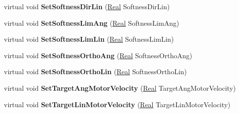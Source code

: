 \begin{DoxyCompactItemize}
\item 
\hypertarget{classphys_1_1SliderConstraint_a3a1c5c42c6f74325f2a2b4b9848903fe}{
virtual void {\bfseries SetSoftnessDirLin} (\hyperlink{namespacephys_af7eb897198d265b8e868f45240230d5f}{Real} SoftnessDirLin)}
\label{classphys_1_1SliderConstraint_a3a1c5c42c6f74325f2a2b4b9848903fe}

\item 
\hypertarget{classphys_1_1SliderConstraint_a8b098fda35892a8e9ae1cca00c1d9a44}{
virtual void {\bfseries SetSoftnessLimAng} (\hyperlink{namespacephys_af7eb897198d265b8e868f45240230d5f}{Real} SoftnessLimAng)}
\label{classphys_1_1SliderConstraint_a8b098fda35892a8e9ae1cca00c1d9a44}

\item 
\hypertarget{classphys_1_1SliderConstraint_a4ecd03e28d90b4dd75059e766df53bc7}{
virtual void {\bfseries SetSoftnessLimLin} (\hyperlink{namespacephys_af7eb897198d265b8e868f45240230d5f}{Real} SoftnessLimLin)}
\label{classphys_1_1SliderConstraint_a4ecd03e28d90b4dd75059e766df53bc7}

\item 
\hypertarget{classphys_1_1SliderConstraint_a4840ed43bbe8b99fb9c33a3da2c97548}{
virtual void {\bfseries SetSoftnessOrthoAng} (\hyperlink{namespacephys_af7eb897198d265b8e868f45240230d5f}{Real} SoftnessOrthoAng)}
\label{classphys_1_1SliderConstraint_a4840ed43bbe8b99fb9c33a3da2c97548}

\item 
\hypertarget{classphys_1_1SliderConstraint_a9821ecd0d7e2dbef81fdb41e5bdfd35a}{
virtual void {\bfseries SetSoftnessOrthoLin} (\hyperlink{namespacephys_af7eb897198d265b8e868f45240230d5f}{Real} SoftnessOrthoLin)}
\label{classphys_1_1SliderConstraint_a9821ecd0d7e2dbef81fdb41e5bdfd35a}

\item 
\hypertarget{classphys_1_1SliderConstraint_a69efafef3a61ae10836e877e71e2d84c}{
virtual void {\bfseries SetTargetAngMotorVelocity} (\hyperlink{namespacephys_af7eb897198d265b8e868f45240230d5f}{Real} TargetAngMotorVelocity)}
\label{classphys_1_1SliderConstraint_a69efafef3a61ae10836e877e71e2d84c}

\item 
\hypertarget{classphys_1_1SliderConstraint_ab07bdade9527e4f3f8de868110ee85fa}{
virtual void {\bfseries SetTargetLinMotorVelocity} (\hyperlink{namespacephys_af7eb897198d265b8e868f45240230d5f}{Real} TargetLinMotorVelocity)}
\label{classphys_1_1SliderConstraint_ab07bdade9527e4f3f8de868110ee85fa}


\end{DoxyCompactItemize}
